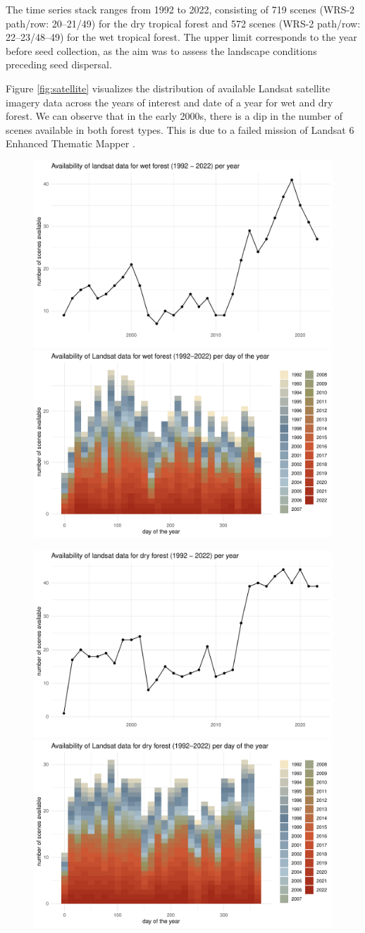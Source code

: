 The time series stack ranges from 1992 to 2022, consisting of 719 scenes (WRS-2 path/row: 20–21/49) for the dry tropical forest and 572 scenes (WRS-2 path/row: 22–23/48–49) for the wet tropical forest. The upper limit corresponds to the year before seed collection, as the aim was to assess the landscape conditions preceding seed dispersal.

Figure \ref{fig:satellite} visualizes the distribution of available Landsat satellite imagery data across the years of interest and date of a year for wet and dry forest. We can observe that in the early 2000s, there is a dip in the number of scenes available in both forest types. This is due to a failed mission of Landsat 6 Enhanced Thematic Mapper \citep{gowardHistoricalRecordLandsat2006}.

\begin{figure}[h]
\centering

\includegraphics[width=0.48\linewidth, keepaspectratio]{Report/figures/wf_sd1.pdf}
\hspace{0.02\linewidth}
\includegraphics[width=0.48\linewidth, keepaspectratio]{Report/figures/wf_sd2.pdf}

\vspace{1cm} %

\includegraphics[width=0.48\linewidth, keepaspectratio]{Report/figures/df_sd1.pdf}
\hspace{0.02\linewidth}
\includegraphics[width=0.48\linewidth, keepaspectratio]{Report/figures/df_sd2.pdf}


\end{figure}
